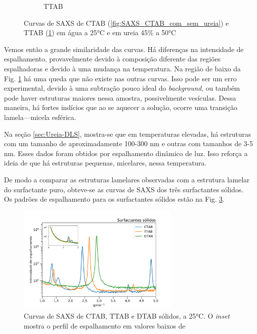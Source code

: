 \begin{figure}[H]
\begin{subfigure}[t]{0.45\textwidth}
			\caption{TTAB}
			\label{fig:SAXS_TTAB_com_sem_ureia}
		\end{subfigure}
		\caption{Curvas de SAXS de CTAB (\ref{fig:SAXS_CTAB_com_sem_ureia}) e TTAB (\ref{fig:SAXS_TTAB_com_sem_ureia}) em água a 25°C e em ureia 45\% a 50°C}
		\label{fig:SAXS_com_sem_ureia}
	\end{figure}
	
	Vemos então a grande similaridade das curvas. Há diferenças na intensidade de espalhamento, provavelmente devido à composição diferente das regiões espalhadoras e devido à uma mudança na temperatura. Na região de baixo \q{} da Fig. \ref{fig:SAXS_TTAB_com_sem_ureia} há uma queda que não existe nas outras curvas. Isso pode ser um erro experimental, devido à uma subtração pouco ideal do \emph{background}, ou também pode haver estruturas maiores nessa amostra, possivelmente vesículas. Dessa maneira, há fortes indícios que ao se aquecer a solução, ocorre uma transição lamela---micela esférica.
	
	Na seção \ref{sec:Ureia-DLS}, mostra-se que em temperaturas elevadas, há estruturas com um tamanho de aproximadamente 100-300 nm e outras com tamanhos de 3-5 nm. Esses dados foram obtidos por espalhamento dinâmico de luz. Isso reforça a ideia de que há estruturas pequenas, micelares, nessa temperatura.

	 
	De modo a comparar as estruturas lamelares observadas com a estrutura lamelar do surfactante puro, obteve-se as curvas de SAXS dos três surfactantes sólidos. Os padrões de espalhamento para os surfactantes sólidos estão na Fig. \ref{fig:SAXS_surf_sólido}.

	\begin{figure}[H]
		\centering
		\includegraphics[width=0.7\textwidth]{imagens/saxs/surfactante_solido}
		\caption{Curvas de SAXS de CTAB, TTAB e DTAB sólidos, a 25°C. O \emph{inset} mostra o perfil de espalhamento em valores baixos de \q}
		\label{fig:SAXS_surf_sólido}
	\end{figure}  %
	

